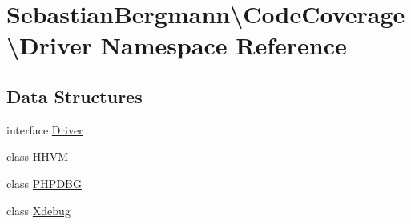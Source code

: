 \hypertarget{namespace_sebastian_bergmann_1_1_code_coverage_1_1_driver}{}\section{Sebastian\+Bergmann\textbackslash{}Code\+Coverage\textbackslash{}Driver Namespace Reference}
\label{namespace_sebastian_bergmann_1_1_code_coverage_1_1_driver}
\subsection*{Data Structures}
\begin{DoxyCompactItemize}
\item 
interface \mbox{\hyperlink{interface_sebastian_bergmann_1_1_code_coverage_1_1_driver_1_1_driver}{Driver}}
\item 
class \mbox{\hyperlink{class_sebastian_bergmann_1_1_code_coverage_1_1_driver_1_1_h_h_v_m}{H\+H\+VM}}
\item 
class \mbox{\hyperlink{class_sebastian_bergmann_1_1_code_coverage_1_1_driver_1_1_p_h_p_d_b_g}{P\+H\+P\+D\+BG}}
\item 
class \mbox{\hyperlink{class_sebastian_bergmann_1_1_code_coverage_1_1_driver_1_1_xdebug}{Xdebug}}
\end{DoxyCompactItemize}
